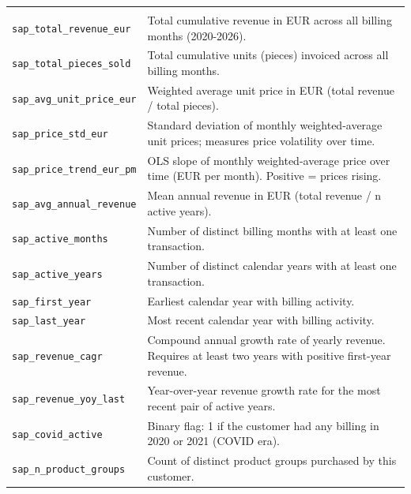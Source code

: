 \documentclass{article}
\begin{document}
\begin{longtable}{@{}p{5.4cm} p{10.6cm}@{}}
\rowcolor{gray!20} \multicolumn{2}{@{}l}{\textit{SAP commercial and portfolio}} \\
\texttt{sap\_\allowbreak total\_\allowbreak revenue\_\allowbreak eur} & Total cumulative revenue in EUR across all billing months (2020-2026). \\
\texttt{sap\_\allowbreak total\_\allowbreak pieces\_\allowbreak sold} & Total cumulative units (pieces) invoiced across all billing months. \\
\texttt{sap\_\allowbreak avg\_\allowbreak unit\_\allowbreak price\_\allowbreak eur} & Weighted average unit price in EUR (total revenue / total pieces). \\
\texttt{sap\_\allowbreak price\_\allowbreak std\_\allowbreak eur} & Standard deviation of monthly weighted-average unit prices; measures price volatility over time. \\
\texttt{sap\_\allowbreak price\_\allowbreak trend\_\allowbreak eur\_\allowbreak pm} & OLS slope of monthly weighted-average price over time (EUR per month). Positive = prices rising. \\
\texttt{sap\_\allowbreak avg\_\allowbreak annual\_\allowbreak revenue} & Mean annual revenue in EUR (total revenue / n active years). \\
\texttt{sap\_\allowbreak active\_\allowbreak months} & Number of distinct billing months with at least one transaction. \\
\texttt{sap\_\allowbreak active\_\allowbreak years} & Number of distinct calendar years with at least one transaction. \\
\texttt{sap\_\allowbreak first\_\allowbreak year} & Earliest calendar year with billing activity. \\
\texttt{sap\_\allowbreak last\_\allowbreak year} & Most recent calendar year with billing activity. \\
\texttt{sap\_\allowbreak revenue\_\allowbreak cagr} & Compound annual growth rate of yearly revenue. Requires at least two years with positive first-year revenue. \\
\texttt{sap\_\allowbreak revenue\_\allowbreak yoy\_\allowbreak last} & Year-over-year revenue growth rate for the most recent pair of active years. \\
\texttt{sap\_\allowbreak covid\_\allowbreak active} & Binary flag: 1 if the customer had any billing in 2020 or 2021 (COVID era). \\
\texttt{sap\_\allowbreak n\_\allowbreak product\_\allowbreak groups} & Count of distinct product groups purchased by this customer. \\

\end{longtable}
\end{document}

